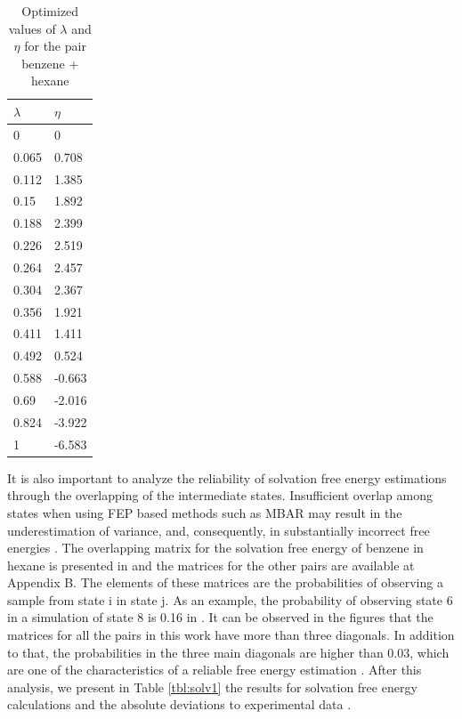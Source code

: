 \begin{table}[h]
    \centering
    \caption{Optimized values of $\lambda$ and $\eta$ for the pair benzene + hexane}
      \label{tbl:lambdahex}
    \begin{tabular}{ll}
        \hline
        \hline
        $\lambda$    &    $\eta$\\ 
        \hline        
        0    &    0\\ 
        0.065    &    0.708\\ 
        0.112    &    1.385\\ 
        0.15    &    1.892 \\ 
        0.188    &    2.399\\ 
        0.226    &    2.519\\ 
        0.264    &    2.457\\ 
        0.304    &    2.367\\ 
        0.356    &    1.921\\ 
        0.411    &    1.411\\ 
        0.492    &    0.524\\ 
        0.588    &    -0.663\\ 
        0.69    &    -2.016 \\ 
        0.824    &    -3.922\\ 
        1        &    -6.583\\     
        \hline
        \hline
    \end{tabular}
\end{table}
\FloatBarrier
It is also important to analyze the reliability of solvation free energy estimations  through the overlapping of the intermediate states. Insufficient overlap among states when using FEP based methods such as MBAR may result in the underestimation of variance, and, consequently, in substantially incorrect free energies \cite{klimovich}. The overlapping matrix for the solvation free energy of benzene in hexane is presented in  and the matrices for the other pairs are available at Appendix B. The elements of these matrices are the probabilities of observing a sample from state  i in state j. As an example, the probability of observing state 6 in a simulation of state 8 is 0.16 in . It can be observed in the figures that  the matrices for all the pairs in this work have more than  three diagonals. In addition to that,  the probabilities in the three main diagonals are higher than 0.03, which are one of the characteristics of a reliable free energy estimation \cite{klimovich}. After this analysis, we present in Table \ref{tbl:solv1} the results for solvation free energy calculations and the absolute deviations to experimental data \cite{doi:10.1021/ci034120c}.   


